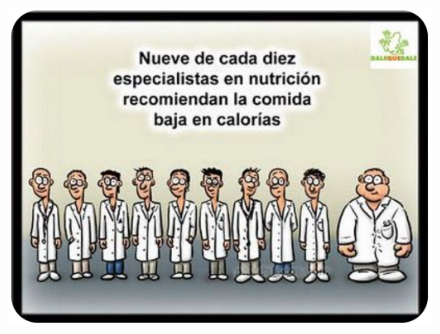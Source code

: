 \begin{figure}[H]
	\centering
	\includegraphics[width=.9\textwidth]{imagenes/imagenes05/T05IM10.png}
	\end{figure}
	

